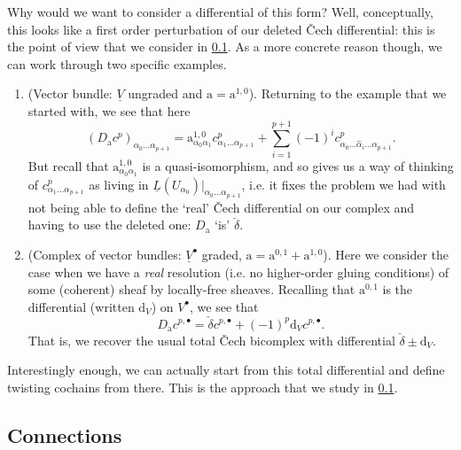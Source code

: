 \documentclass[11pt,notitlepage]{article}
\numberwithin{equation}{subsection}
\renewcommand{\d}{\mathrm{d}}
\begin{document}
                Why would we want to consider a differential of this form?
                Well, conceptually, this looks like a first order perturbation of our deleted Čech differential: this is the point of view that we consider in \cref{ssub:connections}.
                As a more concrete reason though, we can work through two specific examples.

                \begin{enumerate}
                    \item (Vector bundle: $\underline{V}$ ungraded and $\mathrm{a}=\mathrm{a}^{1,0}$).
                        Returning to the example that we started with, we see that here
                        \[(D_\mathrm{a}c^p)_{\alpha_0\ldots\alpha_{p+1}} = \mathrm{a}^{1,0}_{\alpha_0\alpha_1}c^p_{\alpha_1\ldots\alpha_{p+1}} + \sum_{i=1}^{p+1}(-1)^ic^p_{\alpha_0\ldots\hat{\alpha}_i\ldots\alpha_{p+1}}.\]
                        But recall that $\mathrm{a}^{1,0}_{\alpha_0\alpha_1}$ is a quasi-isomorphism, and so gives us a way of thinking of $c^p_{\alpha_1\ldots\alpha_{p+1}}$ as living in $\underline{L}(U_{\alpha_0})|_{\alpha_0\ldots\alpha_{p+1}}$, i.e. it fixes the problem we had with not being able to define the `real' Čech differential on our complex and having to use the deleted one: $D_\mathrm{a}$ `is' $\check{\delta}$.
                    \item (Complex of vector bundles: $\underline{V}^\bullet$ graded, $\mathrm{a}=\mathrm{a}^{0,1}+\mathrm{a}^{1,0}$).
                        Here we consider the case when we have a \textit{real} resolution (i.e. no higher-order gluing conditions) of some (coherent) sheaf by locally-free sheaves.
                        Recalling that $\mathrm{a}^{0,1}$ is the differential (written $\d_V$) on $V^\bullet$, we see that
                        \[D_\mathrm{a}c^{p,\bullet} = \check{\delta}c^{p,\bullet} + (-1)^p\d_V c^{p,\bullet}.\]
                        That is, we recover the usual total Čech bicomplex with differential $\check{\delta}\pm\d_V$.
                \end{enumerate}

                Interestingly enough, we can actually start from this total differential and define twisting cochains from there.
                This is the approach that we study in \cref{ssub:connections}.

            \subsection{Connections}\label{ssub:connections}
\end{document}
